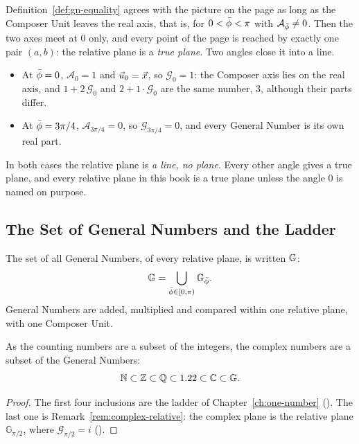 \begin{remark}\label{rem:line-no-plane}
Definition~\ref{def:gn-equality} agrees with the picture on the page as long as the Composer Unit leaves the real axis, that is, for $0 < \bar{\phi} < \pi$ with $\mathcal{A}_{\bar{\phi}} \neq 0$. Then the two axes meet at $0$ only, and every point of the page is reached by exactly one pair $(a, b)$: the relative plane is a \emph{true plane}. Two angles close it into a line.
\begin{itemize}
  \item At $\bar{\phi} = 0$, $\mathcal{A}_0 = 1$ and $\vec{u}_0 = \vec{x}$, so $\mathcal{G}_0 = 1$: the Composer axis lies on the real axis, and $1 + 2\,\mathcal{G}_0$ and $2 + 1 \cdot \mathcal{G}_0$ are the same number, $3$, although their parts differ.
  \item At $\bar{\phi} = 3\pi/4$, $\mathcal{A}_{3\pi/4} = 0$, so $\mathcal{G}_{3\pi/4} = 0$, and every General Number is its own real part.
\end{itemize}
In both cases the relative plane is \emph{a line, no plane}. Every other angle gives a true plane, and every relative plane in this book is a true plane unless the angle $0$ is named on purpose.
\end{remark}

\subsection{The Set of General Numbers and the Ladder}\label{subsec:gn-ladder}

\begin{definition}\label{def:gn-set}
The set of all General Numbers, of every relative plane, is written $\mathbb{G}$:
\[
\mathbb{G} = \bigcup_{\bar{\phi} \in [0, \pi)} \mathbb{G}_{\bar{\phi}} .
\]
General Numbers are added, multiplied and compared within one relative plane, with one Composer Unit.
\end{definition}

\begin{proposition}\label{prop:ladder}
As the counting numbers are a subset of the integers, the complex numbers are a subset of the General Numbers:
\[
\mathbb{N} \subset \mathbb{Z} \subset \mathbb{Q} \subset 1.22 \subset \mathbb{C} \subset \mathbb{G} .
\]
\end{proposition}

\begin{proof}
The first four inclusions are the ladder of Chapter~\ref{ch:one-number} (). The last one is Remark~\ref{rem:complex-relative}: the complex plane is the relative plane $\mathbb{G}_{\pi/2}$, where $\mathcal{G}_{\pi/2} = i$ ().
\end{proof}

